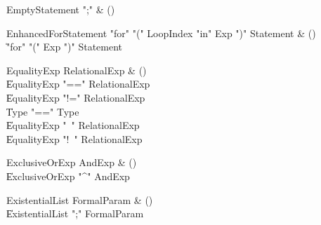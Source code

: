 \begin{bbgrammar}

EmptyStatement \label{prod:EmptyStatement}  \: \xcd";" & () \\


\end{bbgrammar}

\begin{bbgrammar}

EnhancedForStatement \label{prod:EnhancedForStatement}  \: \xcd"for" \xcd"(" LoopIndex \xcd"in" Exp \xcd")" Statement & () \\

    \| \xcd"for" \xcd"(" Exp \xcd")" Statement \\

\end{bbgrammar}

\begin{bbgrammar}

EqualityExp \label{prod:EqualityExp}  \: RelationalExp & () \\

    \| EqualityExp \xcd"==" RelationalExp \\
    \| EqualityExp \xcd"!=" RelationalExp \\
    \| Type  \xcd"==" Type  \\
    \| EqualityExp \xcd"~" RelationalExp \\
    \| EqualityExp \xcd"!~" RelationalExp \\

\end{bbgrammar}

\begin{bbgrammar}

ExclusiveOrExp \label{prod:ExclusiveOrExp}  \: AndExp & () \\

    \| ExclusiveOrExp \xcd"^" AndExp \\

\end{bbgrammar}

\begin{bbgrammar}

ExistentialList \label{prod:ExistentialList}  \: FormalParam & () \\

    \| ExistentialList \xcd";" FormalParam \\

\end{bbgrammar}

